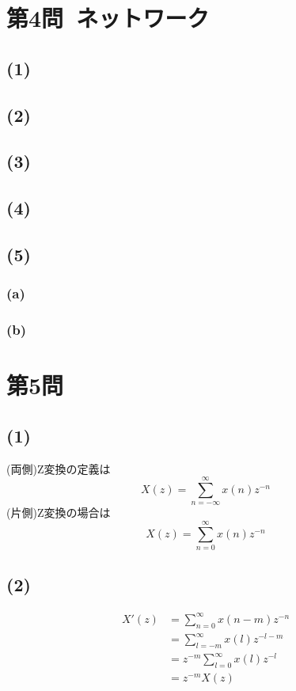 \documentclass[a4paper,12pt,xelatex,ja=standard]{bxjsarticle}
\begin{document}
\section*{第4問\ ネットワーク}
  \subsection*{(1)}
  \subsection*{(2)}
  \subsection*{(3)}
  \subsection*{(4)}
  \subsection*{(5)}
    \subsubsection*{(a)}
    \subsubsection*{(b)}

\section*{第5問\ }
  \subsection*{(1)}
  (両側)Z変換の定義は
  \[
    X(z) = \sum^{\infty}_{n=-\infty}x(n) z^{-n}
  \]
  (片側)Z変換の場合は
  \[
    X(z) = \sum^{\infty}_{n=0}x(n) z^{-n}
  \]

  \subsection*{(2)}
  \begin{equation*}
    \begin{split}
      X'(z) &= \sum^{\infty}_{n=0}x(n-m)z^{-n} \\
            &= \sum^{\infty}_{l=-m}x(l)z^{-l-m} \\
            &= z^{-m} \sum^{\infty}_{l=0}x(l)z^{-l} \\
            &= z^{-m} X(z)
    \end{split}
  \end{equation*}
\end{document}
